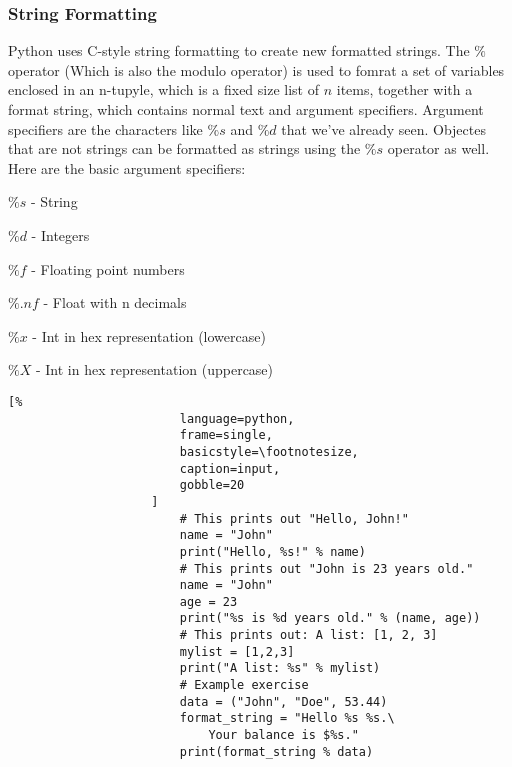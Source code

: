 \documentclass[crop=false,class=book,oneside]{standalone}
\begin{document}
            \subsubsection{String Formatting}
                Python uses C-style string formatting to create new
                formatted strings. The $\%$ operator (Which is also the
                modulo operator) is used to fomrat a set of variables
                enclosed in an n-tupyle, which is a fixed size list of
                $n$ items, together with a format string, which contains
                normal text and argument specifiers. Argument specifiers
                are the characters like $\%s$ and $\%d$ that we've
                already seen. Objectes that are not strings can be
                formatted as strings using the $\%s$ operator as well.
                Here are the basic argument specifiers:
                \begin{itemize}
                    \begin{multicols}{2}
                        \item $\%s$ - String
                        \item $\%d$ - Integers
                        \item $\%f$ - Floating point numbers
                        \item $\%.nf$ - Float with n decimals
                        \item $\%x$ - Int in hex representation
                            (lowercase)
                        \item $\%X$ - Int in hex representation
                            (uppercase)
                    \end{multicols}
                \end{itemize}
                \begin{minipage}[t]{.48\textwidth}
                    \centering
                    \begin{lstlisting}[%
                        language=python,
                        frame=single,
                        basicstyle=\footnotesize,
                        caption=input,
                        gobble=20
                    ]
                        # This prints out "Hello, John!"
                        name = "John"
                        print("Hello, %s!" % name)
                        # This prints out "John is 23 years old."
                        name = "John"
                        age = 23
                        print("%s is %d years old." % (name, age))
                        # This prints out: A list: [1, 2, 3]
                        mylist = [1,2,3]
                        print("A list: %s" % mylist)
                        # Example exercise
                        data = ("John", "Doe", 53.44)
                        format_string = "Hello %s %s.\ 
                            Your balance is $%s."
                        print(format_string % data)
    
                    \end{lstlisting}
                \end{minipage}\hfill
\end{document}
